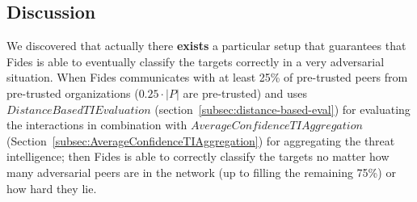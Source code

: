 \subsection{Discussion}
We discovered that actually there \textbf{exists} a particular setup that guarantees that Fides is able to eventually classify the targets correctly in a very adversarial situation. When Fides communicates with at least 25\% of pre-trusted peers from pre-trusted organizations ($0.25 \cdot |P|$ are pre-trusted) and uses $DistanceBasedTIEvaluation$ (section~\ref{subsec:distance-based-eval}) for evaluating the interactions in combination with $AverageConfidenceTIAggregation$ (Section~\ref{subsec:AverageConfidenceTIAggregation}) for aggregating the threat intelligence; then Fides is able to correctly classify the targets no matter how many adversarial peers are in the network (up to filling the remaining 75\%) or how hard they lie.

